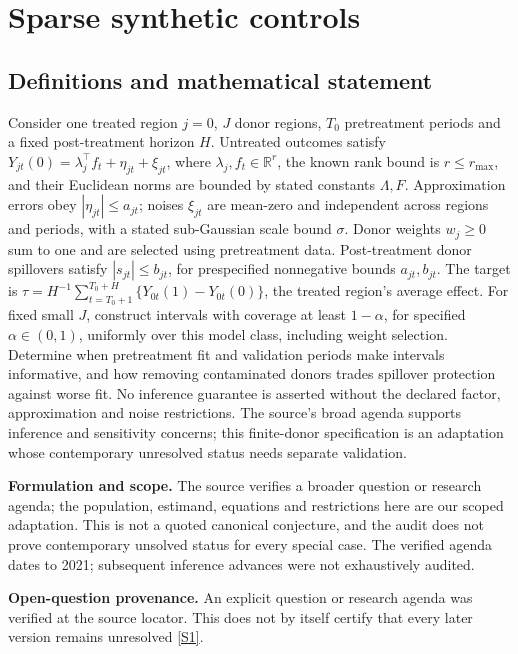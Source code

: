 \documentclass[11pt]{article}
\newcommand{\sref}[2]{\hyperlink{source:#1:#2}{[S#2]}}
\begin{document}
\section*{Sparse synthetic controls}\label{30007707}
\subsection{Definitions and mathematical statement}
Consider one treated region \(j=0\), \(J\) donor regions, \(T_0\) pretreatment periods and a fixed post-treatment horizon \(H\). Untreated outcomes satisfy \(Y_{jt}(0)=\lambda_j^\top f_t+\eta_{jt}+\xi_{jt}\), where \(\lambda_j,f_t\in\mathbb R^r\), the known rank bound is \(r\leq r_{\max}\), and their Euclidean norms are bounded by stated constants \(\Lambda,F\). Approximation errors obey \(|\eta_{jt}|\leq a_{jt}\); noises \(\xi_{jt}\) are mean-zero and independent across regions and periods, with a stated sub-Gaussian scale bound \(\sigma\). Donor weights \(w_j\geq0\) sum to one and are selected using pretreatment data. Post-treatment donor spillovers satisfy \(|s_{jt}|\leq b_{jt}\), for prespecified nonnegative bounds \(a_{jt},b_{jt}\). The target is \(\tau=H^{-1}\sum_{t=T_0+1}^{T_0+H}\{Y_{0t}(1)-Y_{0t}(0)\}\), the treated region's average effect. For fixed small \(J\), construct intervals with coverage at least \(1-\alpha\), for specified \(\alpha\in(0,1)\), uniformly over this model class, including weight selection. Determine when pretreatment fit and validation periods make intervals informative, and how removing contaminated donors trades spillover protection against worse fit. No inference guarantee is asserted without the declared factor, approximation and noise restrictions. The source's broad agenda supports inference and sensitivity concerns; this finite-donor specification is an adaptation whose contemporary unresolved status needs separate validation.

\par\textbf{Formulation and scope.} The source verifies a broader question or research agenda; the population, estimand, equations and restrictions here are our scoped adaptation. This is not a quoted canonical conjecture, and the audit does not prove contemporary unsolved status for every special case. The verified agenda dates to 2021; subsequent inference advances were not exhaustively audited.

\par\textbf{Open-question provenance.} An explicit question or research agenda was verified at the source locator. This does not by itself certify that every later version remains unresolved \sref{30007707}{1}.
\end{document}
